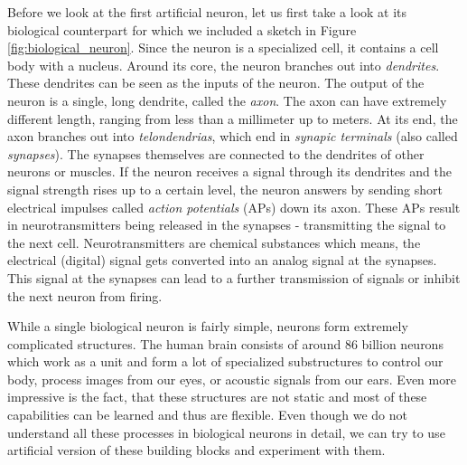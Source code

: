 Before we look at the first artificial neuron, let us first take a look at its biological counterpart for which we included a sketch in Figure \ref{fig:biological_neuron}. Since the neuron is a specialized cell, it contains a cell body with a nucleus. Around its core, the neuron branches out into \textit{dendrites}. These dendrites can be seen as the inputs of the neuron. The output of the neuron is a single, long dendrite, called the \textit{axon}. The axon can have extremely different length, ranging from less than a millimeter up to meters. At its end, the axon branches out into \textit{telondendrias}, which end in \textit{synapic terminals} (also called \textit{synapses}). The synapses themselves are connected to the dendrites of other neurons or muscles. If the neuron receives a signal through its dendrites and the signal strength rises up to a certain level, the neuron answers by sending short electrical impulses called \textit{action potentials} (APs) down its axon. These APs result in neurotransmitters being released in the synapses - transmitting the signal to the next cell. Neurotransmitters are chemical substances which means, the electrical (digital) signal gets converted into an analog signal at the synapses. This signal at the synapses can lead to a further transmission of signals or inhibit the next neuron from firing. 

While a single biological neuron is fairly simple, neurons form extremely complicated structures. The human brain consists of around 86 billion neurons which work as a unit and form a lot of specialized substructures to control our body, process images from our eyes, or acoustic signals from our ears. Even more impressive is the fact, that these structures are not static and most of these capabilities can be learned and thus are flexible. Even though we do not understand all these processes in biological neurons in detail, we can try to use artificial version of these building blocks and experiment with them.

